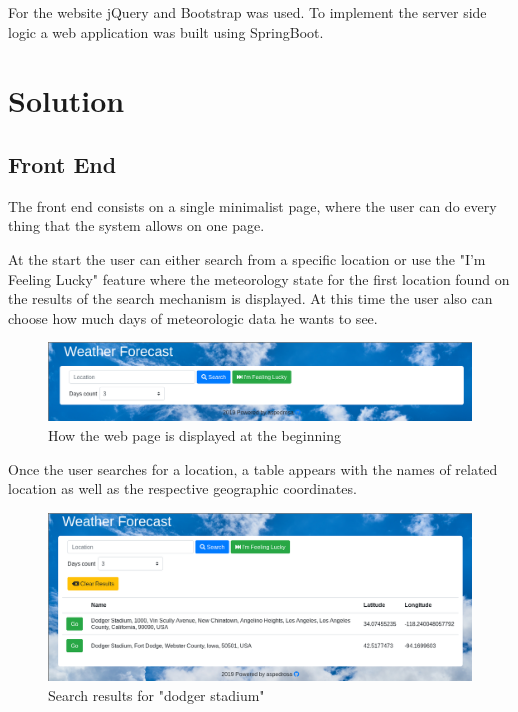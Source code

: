 \documentclass[12pt]{article}
\begin{document}
For the website jQuery and Bootstrap was used. To implement the server side logic a web
  application was built using SpringBoot.

\section{Solution}
\subsection{Front End}

The front end consists on a single minimalist page, where the user can do every thing
  that the system allows on one page.

At the start the user can either search from a specific location or use the "I'm Feeling Lucky"
  feature where the meteorology state for the first location found on the results of
  the search mechanism is displayed. At this time the user also can choose how much days
  of meteorologic data he wants to see.

\begin{figure}[h]
  \center
  \includegraphics[scale=0.35]{start_website.png}
  \caption{How the web page is displayed at the beginning}
\end{figure}

Once the user searches for a location, a table appears with the names of related location
  as well as the respective geographic coordinates.

\begin{figure}[h]
  \center
  \includegraphics[scale=0.35]{after_search_website.png}
  \caption{Search results for "dodger stadium"}
\end{figure}
\end{document}
